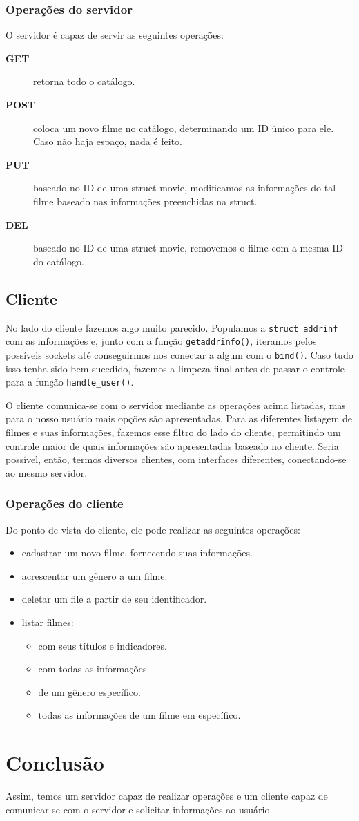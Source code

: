 \documentclass[11pt]{article}
\theoremstyle{definition}
\theoremstyle{definition}
\theoremstyle{remark}
\theoremstyle{remark}
\theoremstyle{remark}
\theoremstyle{remark}
\theoremstyle{definition}
\begin{document}
\subsubsection*{Operações do servidor}
\label{sec:orgdc08a14}
O servidor é capaz de servir as seguintes operações:
\begin{description}
\item[{\textbf{GET}}] retorna todo o catálogo.
\item[{\textbf{POST}}] coloca um novo filme no catálogo, determinando um ID único para ele. Caso não haja espaço, nada é feito.
\item[{\textbf{PUT}}] baseado no ID de uma struct movie, modificamos as informações do tal filme baseado nas informações preenchidas na struct.
\item[{\textbf{DEL}}] baseado no ID de uma struct movie, removemos o filme com a mesma ID do catálogo.
\end{description}


\subsection*{Cliente}
\label{sec:org93f1269}
No lado do cliente fazemos algo muito parecido. Populamos a \texttt{struct addrinf} com as informações e, junto com a função \texttt{getaddrinfo()}, iteramos pelos possíveis sockets até conseguirmos nos conectar a algum com o \texttt{bind()}. Caso tudo isso tenha sido bem sucedido, fazemos a limpeza final antes de passar o controle para a função \texttt{handle\_user()}.

O cliente comunica-se com o servidor mediante as operações acima listadas, mas para o nosso usuário mais opções são apresentadas. Para as diferentes listagem de filmes e suas informações, fazemos esse filtro do lado do cliente, permitindo um controle maior de quais informações são apresentadas baseado no cliente. Seria possível, então, termos diversos clientes, com interfaces diferentes, conectando-se ao mesmo servidor.

\subsubsection*{Operações do cliente}
\label{sec:org9385fdb}
Do ponto de vista do cliente, ele pode realizar as seguintes operações:

\begin{itemize}
\item cadastrar um novo filme, fornecendo suas informações.
\item acrescentar um gênero a um filme.
\item deletar um file a partir de seu identificador.
\item listar filmes:
\begin{itemize}
\item com seus títulos e indicadores.
\item com todas as informações.
\item de um gênero específico.
\item todas as informações de um filme em específico.
\end{itemize}
\end{itemize}

\section*{Conclusão}
\label{sec:org8db9fb8}
Assim, temos um servidor capaz de realizar operações e um cliente capaz de comunicar-se com o servidor e solicitar informações ao usuário.
\end{document}
